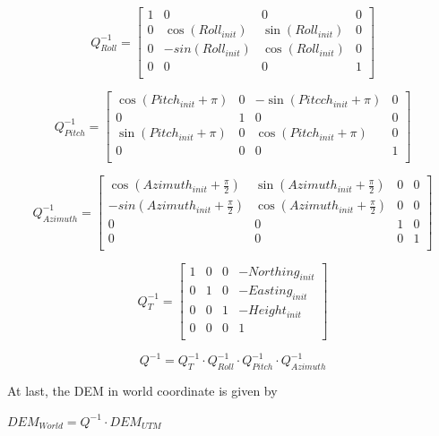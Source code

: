 \begin{equation}
Q_{Roll}^{-1}=\begin{bmatrix}
1 & 0 & 0 & 0 \\
0 & \cos (Roll_{init}) & \sin (Roll_{init}) & 0 \\
0 & -sin(Roll_{init}) & \cos (Roll_{init}) & 0 \\
0 & 0 & 0 & 1 \\
\end{bmatrix}
\end{equation}


\begin{equation}
Q_{Pitch}^{-1}=\begin{bmatrix}
\cos (Pitch_{init}+\pi ) & 0 & -\sin (Pitcch_{init}+\pi ) & 0 \\
0 & 1 & 0 & 0 \\
\sin (Pitch_{init}+\pi ) & 0 & \cos (Pitch_{init}+\pi ) & 0 \\
0 & 0 & 0 & 1 \\
\end{bmatrix}
\end{equation}

\begin{equation}
Q_{Azimuth}^{-1}=\begin{bmatrix}
\cos (Azimuth_{init}+\frac{\pi }{2}) & \sin (Azimuth_{init}+\frac{\pi 
}{2}) & 0 & 0\\
-sin(Azimuth_{init}+\frac{\pi }{2}) & \cos (Azimuth_{init}+\frac{\pi 
}{2}) & 0 & 0 \\
0 & 0 & 1 & 0 \\
0 & 0 & 0 & 1 \\
\end{bmatrix}
\end{equation}


\begin{equation}
Q_{T}^{-1}=\begin{bmatrix}
1 & 0 & 0 & -Northing_{init} \\
0 & 1 & 0 & -Easting_{init} \\
0 & 0 & 1 & -Height_{init} \\
0 & 0 & 0 & 1 \\
\end{bmatrix}
\end{equation}

\begin{equation}
Q^{-1}=Q_{T}^{-1}\cdot Q_{Roll}^{-1}\cdot Q_{Pitch}^{-1}\cdot Q_{Azimuth}^{-1}
\end{equation}

At last, the DEM in world coordinate is given by

$DEM_{World}=Q^{-1}\cdot DEM_{UTM}$


